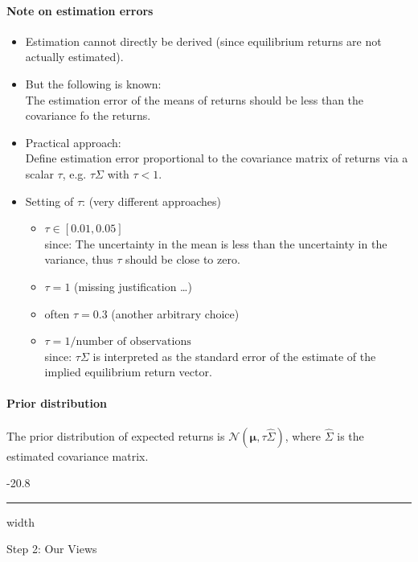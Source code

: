 \documentclass[a4paper,landscape,8pt,fleqn]{scrartcl}
\makeatletter
\renewcommand{\subsubsection}{\@startsection{subsubsection}{1}{0mm}%
{-2\baselineskip}{0.8\baselineskip}%
{\hrule depth 0.2pt width\columnwidth\vspace*{1.2em}\normalsize\bfseries}}
\makeatother
\begin{document}
\begin{multicols*}{3}
\paragraph{Note on estimation errors}
\begin{itemize}
\item Estimation cannot directly be derived (since equilibrium returns are not actually estimated).
\item But the following is known: \\
The estimation error of the means of returns should be less than the covariance fo the returns.
\item Practical approach: \\
Define estimation error proportional to the covariance matrix of returns via a scalar $\tau$, e.g. $\tau \Sigma$ with $\tau < 1$.
\item Setting of $\tau$: (very different approaches)
\begin{itemize}
\item $\tau \in [0.01, 0.05]$ \\
since: The uncertainty in the mean is less than the uncertainty in the variance, thus $\tau$ should be close to zero.
\item $\tau = 1$ (missing justification \ldots)
\item often $\tau = 0.3$ (another arbitrary choice)
\item $\tau = 1 / \text{number of observations}$ \\
since: $\tau \Sigma$ is interpreted as the standard error of the estimate of the implied equilibrium return vector.
\end{itemize}
\end{itemize}

\paragraph{Prior distribution}
The prior distribution of expected returns is $\mathcal{N}(\bm \mu, \tau \hat \Sigma)$, where $\hat \Sigma$ is the estimated covariance matrix.

\subsubsection{Step 2: Our Views}


\end{multicols*}
\end{document}
